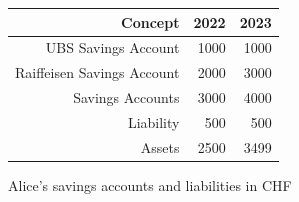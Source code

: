 
\begin{figure}[H]
    \caption{Alice's savings accounts and liabilities in CHF}
    \label{fig:example_facts_aggregation_consistency}
    \centering 
    \begin{tabular}{|r|r|r|}
        \hline
        \textbf{Concept} & \textbf{2022} & \textbf{2023} \\ \hline
        UBS Savings Account & 1000 & 1000 \\ \hline
        Raiffeisen Savings Account & 2000 & 3000 \\ \hline
        Savings Accounts & 3000 & 4000 \\ \hline
        Liability & 500 & 500 \\ \hline
        Assets & 2500 & 3499 \\ \hline
    \end{tabular}
\end{figure}

